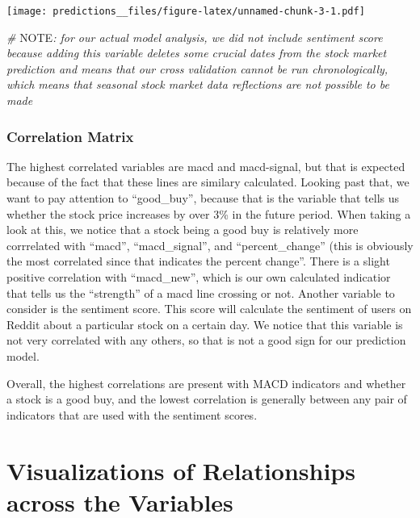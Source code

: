 \documentclass[
]{article}
\newenvironment{Shaded}{\begin{snugshade}}{\end{snugshade}}
\newcommand{\AlertTok}[1]{\textcolor[rgb]{0.94,0.16,0.16}{#1}}
\newcommand{\CommentTok}[1]{\textcolor[rgb]{0.56,0.35,0.01}{\textit{#1}}}
\begin{document}
\texttt{[image: predictions\_\_files/figure-latex/unnamed-chunk-3-1.pdf]}

\begin{Shaded}
\begin{Highlighting}[]
\CommentTok{\# }\AlertTok{NOTE}\CommentTok{: for our actual model analysis, we did not include sentiment score because adding this variable deletes some crucial dates from the stock market prediction and means that our cross validation cannot be run chronologically, which means that seasonal stock market data reflections are not possible to be made }
\end{Highlighting}
\end{Shaded}

\hypertarget{correlation-matrix}{%
\subsubsection{\texorpdfstring{\textbf{Correlation
Matrix}}{Correlation Matrix}}\label{correlation-matrix}}

The highest correlated variables are macd and macd-signal, but that is
expected because of the fact that these lines are similary calculated.
Looking past that, we want to pay attention to ``good\_buy'', because
that is the variable that tells us whether the stock price increases by
over 3\% in the future period. When taking a look at this, we notice
that a stock being a good buy is relatively more corrrelated with
``macd'', ``macd\_signal'', and ``percent\_change'' (this is obviously
the most correlated since that indicates the percent change''. There is
a slight positive correlation with ``macd\_new'', which is our own
calculated indicatior that tells us the ``strength'' of a macd line
crossing or not. Another variable to consider is the sentiment score.
This score will calculate the sentiment of users on Reddit about a
particular stock on a certain day. We notice that this variable is not
very correlated with any others, so that is not a good sign for our
prediction model.

Overall, the highest correlations are present with MACD indicators and
whether a stock is a good buy, and the lowest correlation is generally
between any pair of indicators that are used with the sentiment scores.

\hypertarget{visualizations-of-relationships-across-the-variables}{%
\section{\texorpdfstring{\textbf{Visualizations of Relationships across
the
Variables}}{Visualizations of Relationships across the Variables}}\label{visualizations-of-relationships-across-the-variables}}
\end{document}
